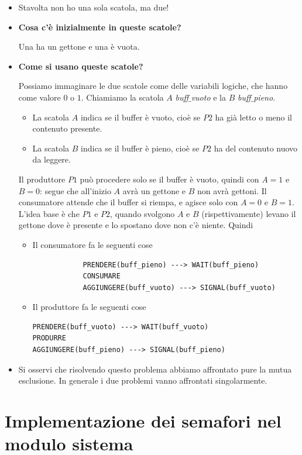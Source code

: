 \documentclass[11pt]{report}
\theoremstyle{definition}
\begin{document}
\begin{itemize}
	\item Stavolta non ho una sola scatola, ma due! 
	\item \textbf{Cosa c'è inizialmente in queste scatole?}  
	
	Una ha un gettone e una è vuota.
	
	\item\textbf{Come si usano queste scatole?}
	
	Possiamo immaginare le due scatole come delle variabili logiche, che hanno come valore $0$ o $1$. Chiamiamo la scatola $A$ \emph{buff$\_$vuoto} e la $B$ \emph{buff$\_$pieno}.
	\begin{itemize}
		\item La scatola $A$ indica se il buffer è vuoto, cioè se $P2$ ha già letto o meno il contenuto presente.
		\item La scatola $B$ indica se il buffer è pieno, cioè se $P2$ ha del contenuto nuovo da leggere.
	\end{itemize}
	Il produttore $P1$ può procedere solo se il buffer è vuoto, quindi con $A=1$ e $B=0$: segue che all'inizio $A$ avrà un gettone e $B$ non avrà gettoni. Il consumatore attende che il buffer si riempa, e agisce solo con $A=0$ e $B=1$. L'idea base è che $P1$ e $P2$, quando svolgono $A$ e $B$ (rispettivamente) levano il gettone dove è presente e lo spostano dove non c'è niente. Quindi
	\begin{itemize}
		\item Il consumatore fa le seguenti cose
		{\small \begin{verbatim}
			PRENDERE(buff_pieno) ---> WAIT(buff_pieno)
			CONSUMARE
			AGGIUNGERE(buff_vuoto) ---> SIGNAL(buff_vuoto)
		\end{verbatim}}
	\item Il produttore fa le seguenti cose
{\small \begin{verbatim}
PRENDERE(buff_vuoto) ---> WAIT(buff_vuoto)
PRODURRE
AGGIUNGERE(buff_pieno) ---> SIGNAL(buff_pieno)
\end{verbatim}}
	\end{itemize}
\item Si osservi che risolvendo questo problema abbiamo affrontato pure la mutua esclusione. In generale i due problemi vanno affrontati singolarmente.
\end{itemize}

\chapter{Implementazione dei semafori nel modulo sistema}
\end{document}

